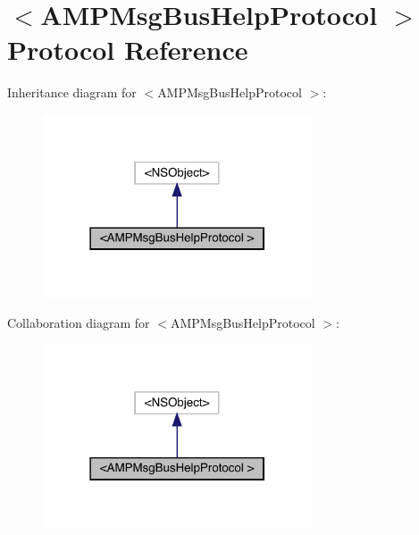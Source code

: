\hypertarget{protocol_a_m_p_msg_bus_help_protocol_01-p}{}\section{$<$A\+M\+P\+Msg\+Bus\+Help\+Protocol $>$ Protocol Reference}
\label{protocol_a_m_p_msg_bus_help_protocol_01-p}


Inheritance diagram for $<$A\+M\+P\+Msg\+Bus\+Help\+Protocol $>$\+:\nopagebreak
\begin{figure}[H]
\begin{center}
\leavevmode
\includegraphics[width=226pt]{protocol_a_m_p_msg_bus_help_protocol_01-p__inherit__graph}
\end{center}
\end{figure}


Collaboration diagram for $<$A\+M\+P\+Msg\+Bus\+Help\+Protocol $>$\+:\nopagebreak
\begin{figure}[H]
\begin{center}
\leavevmode
\includegraphics[width=226pt]{protocol_a_m_p_msg_bus_help_protocol_01-p__coll__graph}
\end{center}
\end{figure}
